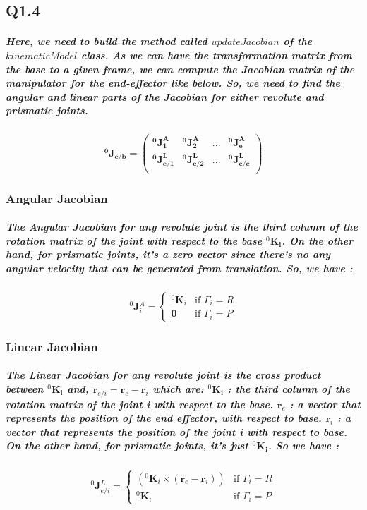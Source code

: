 \subsection{Q1.4}
\subparagraph{Here, we need to build the method called $updateJacobian$ of the $kinematicModel$ class. As we can have the transformation matrix from the base to a given frame, we can compute the Jacobian matrix of the manipulator for the end-effector like below. So, we need to find the angular and linear parts of the Jacobian for either revolute and prismatic joints.  }


\[\mathbf{^0 J_{e/b}} = \begin{pmatrix}
        \mathbf{^0 J^A_{1}} & \mathbf{^0 J^A_{2}} &  ... & \mathbf{^0 J^A_{e}} \\
        \mathbf{^0 J^L_{e/1}} & \mathbf{^0 J^L_{e/2}} & ... & \mathbf{^0 J^L_{e/e}} \\
    \end{pmatrix}\]

\subsubsection{Angular Jacobian} 
\subparagraph{The Angular Jacobian for any revolute joint is the third column of the rotation matrix of the joint with respect to the base $^0\mathbf{K_i}$. On the other hand, for prismatic joints, it's a zero vector since there's no any angular velocity that can be generated from translation. So, we have : }
\[
^{0}\mathbf{J}{}^A_i = 
\begin{cases} 
^{0}\mathbf{K}_i & \text{if } \Gamma_i = R \\ 
\mathbf{0} & \text{if } \Gamma_i = P 
\end{cases}
\]

\subsubsection{Linear Jacobian} 
\subparagraph{The Linear Jacobian for any revolute joint is the cross product between $^0\mathbf{K_i}$ and, $\mathbf{r}_{e/i} = \mathbf{r}_{e} - \mathbf{r}_{i} $ which are:
\newline
$^0\mathbf{K_i}$ : the third column of the rotation matrix of the joint i with respect to the base.
\newline
$\mathbf{r}_{e}$ : a vector that represents the position of the end effector, with respect to base.
\newline
$\mathbf{r}_{i}$ : a vector that represents the position of the joint i with respect to base.
\newline
On the other hand, for prismatic joints, it's just $^0\mathbf{K_i}$. So we have : }
\[
{}^{0}\mathbf{J}{}^L_{e/i} = 
\begin{cases} 
\left( ^0\mathbf{K}_i \times (\mathbf{r}_{e} - \mathbf{r}_{i})  \right) & \text{if } \Gamma_i = R \\ 
^0\mathbf{K}_i & \text{if } \Gamma_i = P
\end{cases}
\]
